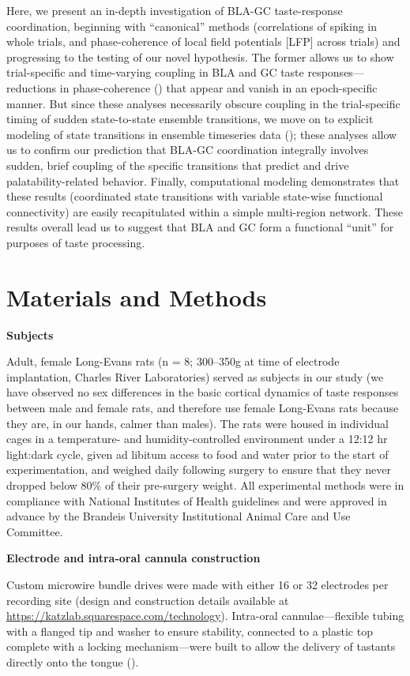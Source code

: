 \begin{refsection}
Here, we present an in-depth investigation of BLA-GC taste-response coordination, beginning with “canonical” methods (correlations of spiking in whole trials, and phase-coherence of local field potentials [LFP] across trials) and progressing to the testing of our novel hypothesis. The former allows us to show trial-specific and time-varying coupling in BLA and GC taste responses—reductions in phase-coherence (\cite{stitt2017a}) that appear and vanish in an epoch-specific manner. But since these analyses necessarily obscure coupling in the trial-specific timing of sudden state-to-state ensemble transitions, we move on to explicit modeling of state transitions in ensemble timeseries data (\cite{rabiner1989a,sadacca2016a}); these analyses allow us to confirm our prediction that BLA-GC coordination integrally involves sudden, brief coupling of the specific transitions that predict and drive palatability-related behavior. Finally, computational modeling demonstrates that these results (coordinated state transitions with variable state-wise functional connectivity) are easily recapitulated within a simple multi-region network. These results overall lead us to suggest that BLA and GC form a functional “unit” for purposes of taste processing. 

\section{Materials and Methods}


\textbf{Subjects}\par
\noindent Adult, female Long-Evans rats (n = 8; 300–350g at time of electrode implantation, Charles River Laboratories) served as subjects in our study (we have observed no sex differences in the basic cortical dynamics of taste responses between male and female rats, and therefore use female Long-Evans rats because they are, in our hands, calmer than males). The rats were housed in individual cages in a temperature- and humidity-controlled environment under a 12:12 hr light:dark cycle, given ad libitum access to food and water prior to the start of experimentation, and weighed daily following surgery to ensure that they never dropped below 80\% of their pre-surgery weight. All experimental methods were in compliance with National Institutes of Health guidelines and were approved in advance by the Brandeis University Institutional Animal Care and Use Committee.

\smallskip
\noindent\textbf{Electrode and intra-oral cannula construction}\par
\noindent Custom microwire bundle drives were made with either 16 or 32 electrodes per recording site (design and construction details available at \url{https://katzlab.squarespace.com/technology}). Intra-oral cannulae—flexible tubing with a flanged tip and washer to ensure stability, connected to a plastic top complete with a locking mechanism—were built to allow the delivery of tastants directly onto the tongue (\cite{fontanini2006a}).


\end{refsection}
